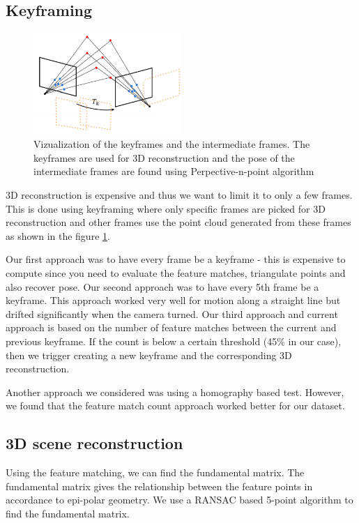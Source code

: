 \documentclass{article}
\begin{document}
\subsection{Keyframing}

\begin{figure}
\centering
\includegraphics[width=0.5\textwidth]{./system_viz}
\caption{Vizualization of the keyframes and the intermediate frames. The keyframes are used for 3D reconstruction and the pose of the intermediate frames are found using Perpective-n-point algorithm}
\label{fig:keyframing}
\end{figure}

3D reconstruction is expensive and thus we want to limit it to only a few frames. This is done using keyframing where only specific frames are picked for 3D reconstruction and other frames use the point cloud generated from these frames as shown in the figure \ref{fig:keyframing}.

Our first approach was to have every frame be a keyframe - this is expensive to compute since you need to evaluate the feature matches, triangulate points and also recover pose. Our second approach was to have every 5th frame be a keyframe. This approach worked very well for motion along a straight line but drifted significantly when the camera turned. Our third approach and current approach is based on the number of feature matches between the current and previous keyframe. If the count is below a certain threshold (45\% in our case), then we trigger creating a new keyframe and the corresponding 3D reconstruction.

Another approach we considered was using a homography based test\cite{homography}. However, we found that the feature match count approach worked better for our dataset.

\subsection{3D scene reconstruction}
Using the feature matching, we can find the fundamental matrix. The fundamental matrix gives the relationship between the feature points in accordance to epi-polar geometry. We use a RANSAC based 5-point algorithm to find the fundamental matrix.
\end{document}
